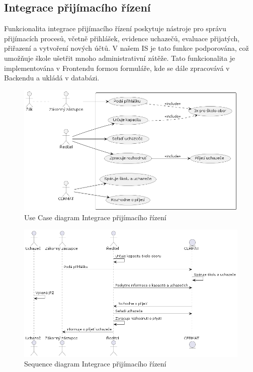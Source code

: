 \documentclass[FM,Proj]{tulthesis}
\begin{document}
\subsection*{Integrace přijímacího řízení}
Funkcionalita integrace přijímacího řízení poskytuje nástroje pro správu přijímacích procesů,
včetně přihlášek, evidence uchazečů, evaluace přijatých, přiřazení a vytvoření nových účtů.
V našem IS je tato funkce podporována, což umožňuje škole ušetřit mnoho administrativní zátěže.
Tato funkcionalita je implementována v Frontendu formou formuláře, kde se dále zpracovává v 
Backendu a ukládá v databázi.

\begin{figure}[H]
    \includegraphics[width=\textwidth-28pt]{uc-integrace-prijimaciho-rizeni.png}
    \caption{Use Case diagram Integrace přijímacího řízení}
    \label{fig:uc-integrace-prijimaciho-rizeni}
\end{figure}

\begin{figure}[H]
    \includegraphics[width=\textwidth-28pt]{seq-integrace-prijimaciho-rizeni.png}
    \caption{Sequence diagram Integrace přijímacího řízení}
    \label{fig:seq-integrace-prijimaciho-rizeni}
\end{figure}
\end{document}
